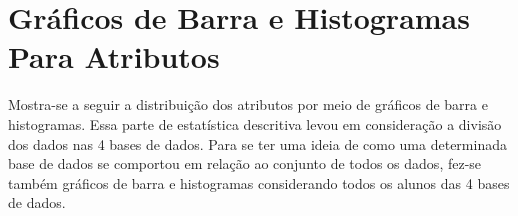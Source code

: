 \clearpage

\section{Gráficos de Barra e Histogramas Para Atributos} \label{graf_bar_hist}
Mostra-se a seguir a distribuição dos atributos por meio de gráficos de barra e
histogramas. Essa parte de estatística descritiva levou em consideração a divisão dos
dados nas 4 bases de dados. Para se ter uma ideia de como uma determinada base de
dados se comportou em relação ao conjunto de todos os dados, fez-se também gráficos
de barra e histogramas considerando todos os alunos das 4 bases de dados.  


